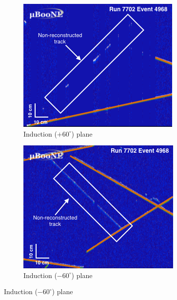 \documentclass[a4paper,11pt]{article}
\begin{document}
\begin{figure}[htbp]
  \begin{center}
    \begin{subfigure}{0.3\textwidth}
      \includegraphics[width=\linewidth]{figures/u.png}
      \caption{Induction ($+60^{\circ}$) plane} \label{fig:u}
    \end{subfigure}
    \begin{subfigure}{0.3\textwidth}
      \includegraphics[width=\linewidth]{figures/v.png}
      \caption{Induction ($-60^{\circ}$) plane} \label{fig:v}
    \end{subfigure}

\end{center}
\end{figure}
\end{document}
